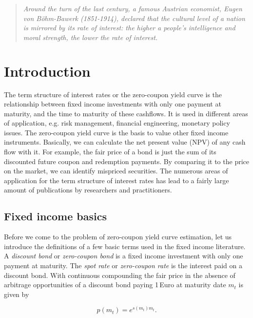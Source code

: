 
\begin{quote}
\emph{
  Around the turn of the last century, a famous Austrian economist, Eugen von B\"{o}hm-Bawerk (1851-1914), declared that the cultural level of a nation is  mirrored by its rate of interest: the higher a people's intelligence and moral strength, the lower the rate of interest.}
\\
\end{quote}


\section{Introduction}


The term structure of interest rates or the zero-coupon yield curve is the relationship between fixed income investments with only one payment at maturity, and the time to maturity of these cashflows. It is used in different areas of application, e.g. risk management, financial engineering, monetary policy issues. The zero-coupon yield curve is the basis to value other fixed income instruments. Basically, we can calculate the net present value (NPV) of any cash flow with it. For example, the fair price of a bond is just the sum of its discounted future coupon and redemption payments. By comparing it to the price on the market, we can identify mispriced securities. The numerous areas of application for the term structure of interest rates has lead to a fairly large amount of publications by researchers and practitioners.

\subsection{Fixed income basics}

Before we come to the problem of zero-coupon yield curve estimation, let us introduce the definitions of a few basic terms used in the fixed income literature. A \emph{discount bond} or \emph{zero-coupon bond} is a fixed income investment with only one payment at maturity. The \emph{spot rate} or \emph{zero-coupon rate} is the interest paid on a discount bond. With continuous compounding the fair price in the absence of arbitrage opportunities of a discount bond paying 1\,Euro at maturity date  $m_t$ is given by

\begin{equation}
  \label{eq:pricediscountbond}
  p(m_t)=e^{s(m_t)m_t}.
\end{equation}

